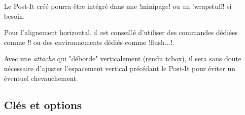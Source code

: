 \documentclass[french,a4paper,11pt]{article}
\begin{document}
\begin{tipblock}
Le Post-It créé pourra être intégré dans une \motcletex!minipage! ou un \motcletex!wrapstuff! si besoin.

Pour l'alignement horizontal, il est conseillé d'utiliser des commandes dédiées comme \motcletex!\hfill! ou des environnements dédiés comme \motcletex!flush...!.
\end{tipblock}

\begin{warningblock}
Avec une \textit{attache} qui "déborde" verticalement (rendu \textsf{tcbox}), il sera sans doute nécessaire d'ajuster l'espacement vertical précédant le Post-It pour éviter un éventuel chevauchement.
\end{warningblock}

\subsection{Clés et options}
\end{document}
